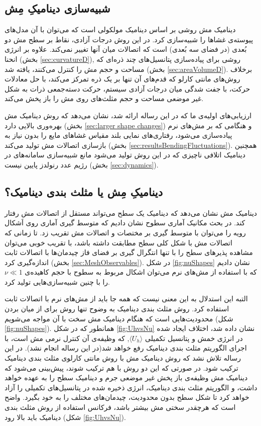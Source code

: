 \subsection{
شبیه‌سازی دینامیکِ مِش
}
دینامیک مش روشی بر اساس دینامیک مولکولی است که می‌توان با آن مدل‌های پیوسته‌ی غشا‌ها را شبیه‌سازی کرد. در این روش درجات آزادی، نقاط بر سطح مش دو بُعدی (در فضای سه بُعدی) است که اتصالات میان آنها تغییر نمی‌کند. علاوه بر انرژی انحنا (بخش
\ref{sec:curvatureD}),
روشی برای پیاده‌سازی پتانسیل‌های چند ذره‌ای که مساحت و حجم مش را کنترل می‌کنند، یافته شد (بخش
 \ref{sec:areaVolumeD}).
  برخلاف روش‌های مانتی کارلو که قدم‌های آن تنها بر یک ذره تمرکز می‌کند، با حل معادلات حرکت، با جفت شدگی میان درجات آزادی سیستم، حرکت دسته‌جمعی ذرات به شکل غیر موضعی مساحت‌ و حجم‌ مثلث‌های روی مش را باز پخش می‌کند.

ارزیابی‌های اولیه‌ی ما که در این رساله ارائه شد، نشان می‌دهد که روش دینامیک مش بهره‌وری بالایی دارد (بخش
\ref{sec:larger shape changes})
 و هنگامی که بر مش‌های نرم پیاده‌سازی می‌شود، رفتاری‌های نمایی بلند مقیاس غشا‌های مایع را بدون نیاز به بازسازی اتصالات مش تولید می‌کند (بخش
\ref{sec:resultsBendingFluctuations}).
همچنین دینامیک اتلافی ناچیزی که در این روش تولید می‌شود مانع شبیه‌سازی سامانه‌های در رژیم عدد رنولدز پایین نیست (بخش
\ref{sec:dynamics}).

\subsection{
دینامیکِ مِش یا مثلث بندی دینامیک؟
}
دینامیک مش نشان می‌دهد که دینامیک یک سطح می‌تواند مستقل از اتصالات مش رفتار کند. در بحث مکانیک آماری سطوح نشان دادیم که متوسط گیری آماری روی اَشکال رویه را می‌توان با متوسط گیری بر مختصات و اتصالات مش تقریب زد. تا زمانی که اتصالات مش با شکل کلی سطح مطابقت داشته باشد، با تقریب خوبی می‌توان مشاهده پذیر‌های سطح را با تنها انتگرال ‌گیری بر فضای فاز چیدمان‌ها با اتصالات ثابت اندازه‌گیری کرد  (بخش
\ref{sec:MeshObservables}).
 در شکل
\ref{fig:nuShapes}
نشان دادیم که با استفاده از مش‌های نرم می‌توان اشکال مربوط به سطوح با حجم کاهیده‌ی
$\nu\ll1$
را با چنین شبیه‌سازی‌هایی تولید کرد.

التبه این استدلال به این معنی نیست که همه جا باید از مش‌های نرم با اتصالات ثابت استفاده کرد. روش مثلث بندی دینامیک
\cite{BoalPRA1992, Gompper1992Science}
به وضوح تنها روش برای از میان بردن محدودیت‌هایی است که هنگام دینامیک مش سخت با آن مواجه می‌شویم (شکل
\ref{fig:nuShapes}).
 همانطور که در شکل
\ref{fig:UhvsNu}
نشان داده شد، اختلاف ایجاد شده در انرژی خمش و پتانسیل تکمیلی
 $\langle U_h\rangle$,
که وظیفه‌ی آن کنترل نرمی مش است، با اجرای الگوریتم  مثلث بندی دینامیک رفع خواهد شد(در این رساله انجام نشد). در این رساله تلاش نشد که روش دینامیک مش با روش مانتی کارلوی  مثلث بندی دینامیک ترکیب شود. در صورتی که این دو روش با هم ترکیب شوند، پیش‌بینی می‌شود که  دینامیک مش وظیفه‌ی باز پخش غیر موضعی جرم و دینامیک سطح را به عهده خواهد داشت، و الگوریتم  مثلث بندی دینامیک، انرژی ذخیره شده در پتانسیل‌های تکمیلی را آزاد خواهد کرد تا شکل سطح بدون محدودیت، چیدمان‌های مختلف را به خود بگیرد. واضح است که هرچقدر سختی مش بیشتر باشد، فرکانس استفاده از روش مثلث بندی دینامیک  باید بالا رود (شکل
\ref{fig:UhvsNu}).


